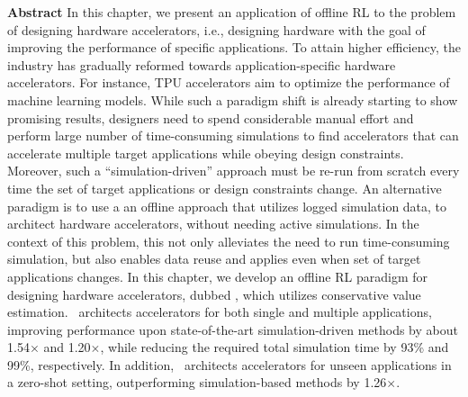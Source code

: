 \documentclass[../thesis.tex]{subfiles}
\begin{document}

% 

% 
% 
% 
% 
% 
% 

\vspace{-0.4cm}
\begin{AIbox}{\large{\textbf{Abstract}}}
\vspace{4mm}
In this chapter, we present an application of offline RL to the problem of designing hardware accelerators, i.e., designing hardware with the goal of improving the performance of specific applications. To attain higher efficiency, the industry has gradually reformed towards application-specific hardware accelerators. For instance, TPU accelerators aim to optimize the performance of machine learning models. While such a paradigm shift is already starting to show promising results, designers need to spend considerable manual effort and perform large number of time-consuming simulations to find accelerators that can accelerate multiple target applications while obeying design constraints. Moreover, such a ``simulation-driven'' approach must be re-run from scratch every time the set of target applications or design constraints change. An alternative paradigm is to use a an offline approach that utilizes logged simulation data, to architect hardware accelerators, without needing active simulations. In the context of this problem, this not only alleviates the need to run time-consuming simulation, but also enables data reuse and applies even when set of target applications changes. In this chapter, we develop an offline RL paradigm for designing hardware accelerators, dubbed \primemethodname, which utilizes conservative value estimation.
\primemethodname\ architects accelerators for both single and multiple applications, improving performance upon state-of-the-art simulation-driven methods by about 1.54$\times$ and 1.20$\times$, while reducing the required total simulation time by 93\% and 99\%, respectively.
In addition, \primemethodname\ architects accelerators for unseen applications in a zero-shot setting, outperforming simulation-based methods by 1.26$\times$.
\vspace{2mm}
\end{AIbox}









\end{document}
